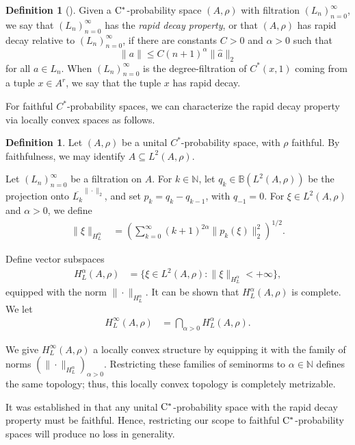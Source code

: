 \documentclass[11pt]{article}
\theoremstyle{definition}
\newtheorem{defn}[thm]{Definition}
\theoremstyle{remark}
\numberwithin{equation}{section}
\numberwithin{equation}{section}
\def\N{\mathbb{N}}
\numberwithin{equation}{section}
\begin{document}
\begin{defn}[\cite{HKER25}]
Given a ${\rm C}^*$-probability space $(A,\rho)$ with filtration $(L_{n})_{n=0}^{\infty}$, we say that $(L_{n})_{n=0}^{\infty}$ has the \emph{rapid decay property}, or that $(A,\rho)$  has rapid decay relative to $(L_{n})_{n=0}^{\infty}$, if 
there are constants $C>0$ and $\alpha>0$ such that 
    \[
    \|a\|\leq C(n+1)^{\alpha}\|\hat a\|_{2}
    \]
    for all $a\in L_{n}$.
  When $(L_{n})_{n=0}^{\infty}$ is the degree-filtration of $C^{*}(x,1)$ coming from a tuple $x\in A^r$, we say that the tuple $x$ has rapid decay.  
\end{defn}




For faithful $C^{*}$-probability spaces, we can characterize the rapid decay property via locally convex spaces as follows.

\begin{defn}
Let $(A,\rho)$ be a unital $C^{*}$-probability space, with $\rho$ faithful. By faithfulness, we may identify $A\subseteq L^{2}(A,\rho)$. 

Let $(L_{n})_{n=0}^{\infty}$ be a filtration on $A$. For $k\in \N$, let $q_{k}\in \mathbb B(L^2(A,\rho))$ be the projection onto $\overline{L_{k}}^{\|\cdot\|_2}$, and set $p_{k}=q_{k}-q_{k-1}$, with $q_{-1}=0$. For $\xi\in L^{2}(A,\rho)$ and $\alpha>0$, we define
\begin{align*}
\|\xi\|_{H^{\alpha}_L} &=\left(\sum_{k=0}^{\infty}(k+1)^{2\alpha}\|p_{k}(\xi)\|_{2}^{2}\right)^{1/2}.
\end{align*}

Define vector subspaces
\begin{align*}
H_L^{\alpha}(A,\rho) &=\{\xi\in L^{2}(A,\rho):\|\xi\|_{H^{\alpha}_L}<+\infty\},
\end{align*}
equipped with the norm $\|\cdot\|_{H^{\alpha}_L}$. It can be shown that $H_L^{\alpha}(A,\rho)$ is complete.
We let 
\begin{align*}
H_L^{\infty}(A,\rho)&=\bigcap_{\alpha>0}H_L^{\alpha}(A,\rho).
\end{align*}
\end{defn}

We give $H_L^{\infty}(A,\rho)$ a locally convex structure by equipping it with the family of norms $(\|\cdot\|_{H^{\alpha}_L})_{\alpha>0}$. Restricting these families of seminorms to $\alpha\in \N$ defines the same topology; thus, this locally convex topology is completely metrizable. 

It was established in \cite[Proposition 3.3]{HKER25} that any unital ${\rm C}^*$-probability space with the rapid decay property must be faithful. Hence, restricting our scope to faithful ${\rm C}^*$-probability spaces will produce no loss in generality.
\end{document}
